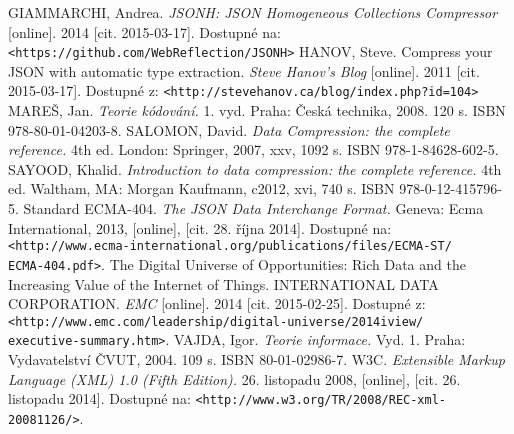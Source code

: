 \begin{thebibliography}{99}
 GIAMMARCHI, Andrea. {\em JSONH: JSON Homogeneous Collections Compressor} [online]. 2014 [cit. 2015-03-17]. Dostupné na: {\tt <https://github.com/WebReflection/JSONH>}
 HANOV, Steve. Compress your JSON with automatic type extraction. {\em Steve Hanov's Blog} [online]. 2011 [cit. 2015-03-17]. Dostupné z: {\tt <http://stevehanov.ca/blog/index.php?id=104>}
 MAREŠ, Jan. {\em Teorie kódování.} 1. vyd. Praha: Česká technika, 2008. 120 s. ISBN 978-80-01-04203-8.
 SALOMON, David. {\em Data Compression: the complete reference.} 4th ed. London: Springer, 2007, xxv, 1092 s. ISBN 978-1-84628-602-5.
	SAYOOD, Khalid. {\em Introduction to data compression: the complete reference.} 4th ed. Waltham, MA: Morgan Kaufmann, c2012, xvi, 740 s. ISBN 978-0-12-415796-5.
 Standard ECMA-404. {\em The JSON Data Interchange Format.} Geneva: Ecma International, 2013, [online], [cit. 28. října 2014]. Dostupné na: {\tt <http://www.ecma-international.org/publications/files/ECMA-ST/\\ECMA-404.pdf>}.
 The Digital Universe of Opportunities: Rich Data and the Increasing Value of the Internet of Things. INTERNATIONAL DATA CORPORATION. {\em EMC} [online]. 2014 [cit. 2015-02-25]. Dostupné z: {\tt <http://www.emc.com/leadership/digital-universe/2014iview/\\executive-summary.htm>}.
 VAJDA, Igor. {\em Teorie informace.} Vyd. 1. Praha: Vydavatelství ČVUT, 2004. 109 s. ISBN 80-01-02986-7.
 W3C. {\em Extensible Markup Language (XML) 1.0 (Fifth Edition).} 26. listopadu 2008, [online], [cit. 26. listopadu 2014]. Dostupné na: {\tt <http://www.w3.org/TR/2008/REC-xml-20081126/>}.
\end{thebibliography}
